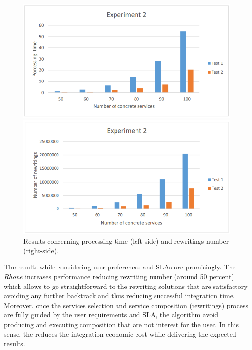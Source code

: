 \begin{figure}%
\centering
\parbox{2.2in}{\includegraphics[scale=0.30]{exp2.png}}%
\qquad
\begin{minipage}{2in}%
\includegraphics[scale=0.30]{exp3.png}
\end{minipage}%
\caption{Results concerning processing time (left-side) and rewritings number (right-side).}%
\label{fig:fig02}%
\end{figure}

The results while considering user preferences and SLAs are promisingly.  
The \textit{Rhone} increases performance reducing rewriting number (around 50 percent) which allows to go straightforward to the rewriting solutions that are satisfactory avoiding any further backtrack and thus reducing successful integration time. Moreover, once the services selection and service composition (rewritings) process are fully guided by the user requirements and SLA, the algorithm avoid producing and executing composition that are not interest for the user. In this sense, the reduces the integration economic cost while delivering the expected results.
